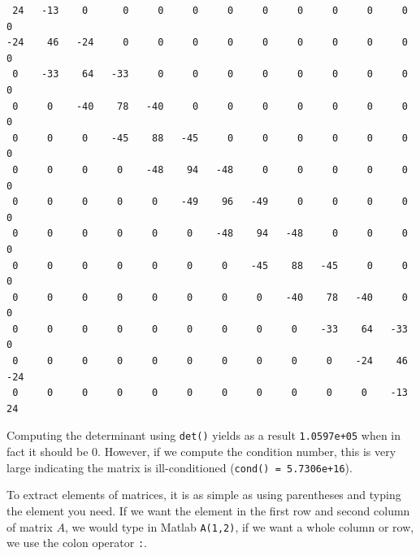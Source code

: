 \documentclass[a4paper,11pt]{article}
\begin{document}
\begin{verbatim}
 24   -13    0      0     0     0     0     0     0     0     0     0     0
-24    46   -24     0     0     0     0     0     0     0     0     0     0
 0    -33    64   -33     0     0     0     0     0     0     0     0     0
 0     0    -40    78   -40     0     0     0     0     0     0     0     0
 0     0     0    -45    88   -45     0     0     0     0     0     0     0
 0     0     0     0    -48    94   -48     0     0     0     0     0     0
 0     0     0     0     0    -49    96   -49     0     0     0     0     0
 0     0     0     0     0     0    -48    94   -48     0     0     0     0
 0     0     0     0     0     0     0    -45    88   -45     0     0     0
 0     0     0     0     0     0     0     0    -40    78   -40     0     0
 0     0     0     0     0     0     0     0     0    -33    64   -33     0
 0     0     0     0     0     0     0     0     0     0    -24    46   -24
 0     0     0     0     0     0     0     0     0     0     0    -13    24
\end{verbatim}

Computing the determinant using \verb;det(); yields as a result \verb;1.0597e+05; when in fact it should be 0. However, if we compute the condition number, this is very large indicating the matrix is ill-conditioned (\verb;cond() = 5.7306e+16;).

To extract elements of matrices, it is as simple as using parentheses and typing the element you need. If we want the element in the first row and second column of matrix $A$, we would type in Matlab \verb;A(1,2);, if we want a whole column or row, we use the colon operator \verb;:;.
\end{document}
